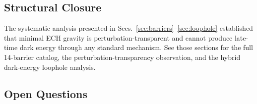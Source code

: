 \documentclass[aps,prd,twocolumn,superscriptaddress,showpacs,preprintnumbers,nofootinbib,longbibliography,floatfix]{revtex4-2}
\begin{document}
\subsection{Structural Closure}\label{sec:ech_closure}

The systematic analysis presented in Secs.~\ref{sec:barriers}--\ref{sec:loophole} established that minimal ECH gravity is perturbation-transparent and cannot produce late-time dark energy through any standard mechanism. See those sections for the full 14-barrier catalog, the perturbation-transparency observation, and the hybrid dark-energy loophole analysis.

\subsection{Open Questions}
\end{document}
